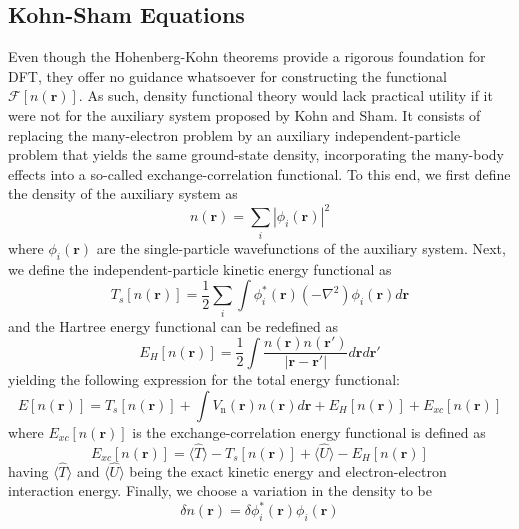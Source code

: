 \subsection{Kohn-Sham Equations}
Even though the Hohenberg-Kohn theorems provide a rigorous foundation for DFT, they offer no guidance whatsoever for constructing the functional $\mathcal{F}[n(\mathbf{r})]$. As such, density functional theory would lack practical utility if it were not for the auxiliary system proposed by Kohn and Sham\supercite{martin2020electronic}. It consists of replacing the many-electron problem by an auxiliary independent-particle problem that yields the same ground-state density, incorporating the many-body effects into a so-called exchange-correlation functional. To this end, we first define the density of the auxiliary system as
\begin{equation}
  n(\mathbf{r}) = \sum_i |\phi_i(\mathbf{r})|^2
  \label{eq49}
\end{equation}
where $\phi_i(\mathbf{r})$ are the single-particle wavefunctions of the auxiliary system. Next, we define the independent-particle kinetic energy functional as 
\begin{equation}
  \label{eq50}
  T_s[n(\mathbf{r})] = \frac{1}{2}\sum_i \int \phi_i^*(\mathbf{r}) (-\nabla^2 )\phi_i(\mathbf{r}) d\mathbf{r}
\end{equation}
and the Hartree energy functional can be redefined as 
\begin{equation}
  \label{eq51}
  E_H[n(\mathbf{r})] = \frac{1}{2} \int \frac{n(\mathbf{r}) n(\mathbf{r'})}{|\mathbf{r} - \mathbf{r'}|} d\mathbf{r} d\mathbf{r'}
\end{equation}
yielding the following expression for the total energy functional:
\begin{equation}
  \label{eq52}
  E[n(\mathbf{r})] = T_s[n(\mathbf{r})] + \int V_{\text{n}}(\mathbf{r}) n(\mathbf{r}) d\mathbf{r} + E_H[n(\mathbf{r})] + E_{xc}[n(\mathbf{r})]
\end{equation}
where $E_{xc}[n(\mathbf{r})]$ is the exchange-correlation energy functional is defined as
\begin{equation}
  \label{eq53}
  E_{xc}[n(\mathbf{r})] = \langle \hat{T} \rangle - T_s[n(\mathbf{r})] + \langle \hat{U}\rangle - E_H[n(\mathbf{r})]
\end{equation}
having $\langle \hat{T} \rangle$ and $\langle \hat{U} \rangle$ being the exact kinetic energy and electron-electron interaction energy. Finally, we choose a variation in the density to be 
\begin{equation}
  \delta n(\mathbf{r}) = \delta \phi_i^*(\mathbf{r}) \phi_i(\mathbf{r}) 
  \label{eq54}
\end{equation}
